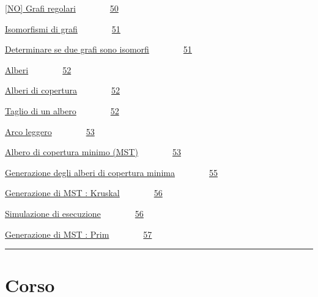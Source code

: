 \documentclass{article}
\begin{document}
{\protect\hyperlink{h.m8b6lpkoqj6x}{{[}NO{]} Grafi
regolari}}{~~~~~~~~}{\protect\hyperlink{h.m8b6lpkoqj6x}{50}}

{\protect\hyperlink{h.d5v408sc7po0}{Isomorfismi di
grafi}}{~~~~~~~~}{\protect\hyperlink{h.d5v408sc7po0}{51}}

{\protect\hyperlink{h.umjijdswjd6a}{Determinare se due grafi sono
isomorfi}}{~~~~~~~~}{\protect\hyperlink{h.umjijdswjd6a}{51}}

{\protect\hyperlink{h.jnoiha3cadu8}{Alberi}}{~~~~~~~~}{\protect\hyperlink{h.jnoiha3cadu8}{52}}

{\protect\hyperlink{h.9btor4ygb1hb}{Alberi di
copertura}}{~~~~~~~~}{\protect\hyperlink{h.9btor4ygb1hb}{52}}

{\protect\hyperlink{h.rdrr6bsx8ypo}{Taglio di un
albero}}{~~~~~~~~}{\protect\hyperlink{h.rdrr6bsx8ypo}{52}}

{\protect\hyperlink{h.gfycwx7ubmbv}{Arco
leggero}}{~~~~~~~~}{\protect\hyperlink{h.gfycwx7ubmbv}{53}}

{\protect\hyperlink{h.1evqcdl7exzv}{Albero di copertura minimo
(MST)}}{~~~~~~~~}{\protect\hyperlink{h.1evqcdl7exzv}{53}}

{\protect\hyperlink{h.42rszsg7qe80}{Generazione degli alberi di
copertura minima}}{~~~~~~~~}{\protect\hyperlink{h.42rszsg7qe80}{55}}

{\protect\hyperlink{h.tpoo55sx1m98}{Generazione di MST :
Kruskal}}{~~~~~~~~}{\protect\hyperlink{h.tpoo55sx1m98}{56}}

{\protect\hyperlink{h.4n5zx1ni4b2b}{Simulazione di
esecuzione}}{~~~~~~~~}{\protect\hyperlink{h.4n5zx1ni4b2b}{56}}

{\protect\hyperlink{h.l5wypo8krmqc}{Generazione di MST :
Prim}}{~~~~~~~~}{\protect\hyperlink{h.l5wypo8krmqc}{57}}

{}

\begin{center}\rule{0.5\linewidth}{\linethickness}\end{center}

\section{\texorpdfstring{{}}{}}\label{h.3n9hcd93vjrp}

\hypertarget{h.h3wcjgbw0vzs}{\section{\texorpdfstring{{Corso}}{Corso}}\label{h.h3wcjgbw0vzs}}
\end{document}
